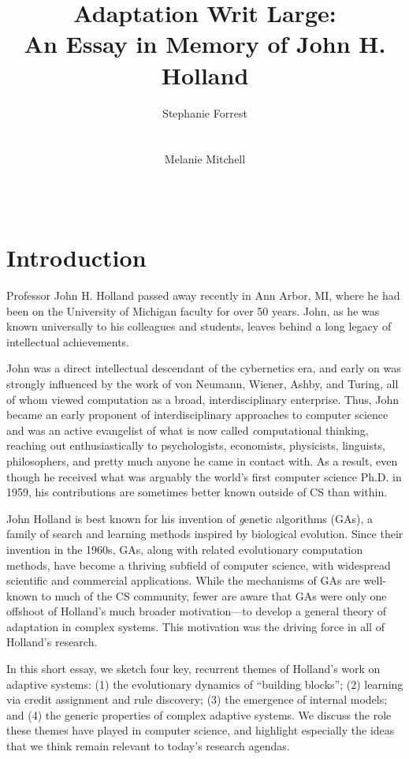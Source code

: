 \documentclass{sig-alternate}
\title{Adaptation Writ Large:\\ An Essay in Memory of John H. Holland}
\author 
{\alignauthor
 Stephanie Forrest\\
 \affaddr{University of New Mexico}\\
 \affaddr{Santa Fe Institute}\\
 \email{forrest@cs.unm.edu}
 \alignauthor
Melanie Mitchell \\
 \affaddr{Portland State University}\\
 \affaddr{Santa Fe Institute}\\
 \email{mm@pdx.edu}
}
\begin{document}
\maketitle

% 

\section{Introduction}

Professor John H. Holland passed away recently in Ann Arbor, MI, where
he had been on the University of Michigan faculty for over 50 years.
John, as he was known universally to his colleagues and students,
leaves behind a long legacy of intellectual achievements.  

John was a direct intellectual descendant of the cybernetics era, and
early on was strongly influenced by the work of von Neumann, Wiener,
Ashby, and Turing, all of whom viewed computation as a broad,
interdisciplinary enterprise.  Thus, John became an early proponent of
interdisciplinary approaches to computer science and was an active
evangelist of what is now called {\emph computational thinking}, reaching out
enthusiastically to psychologists, economists, physicists, linguists,
philosophers, and pretty much anyone he came in contact with.  As a
result, even though he received what was arguably the world's first
computer science Ph.D. in 1959, his contributions are sometimes better known
outside of CS than within.

John Holland is best known for his invention of {\emph genetic
  algorithms} (GAs), a family of search and learning methods inspired
by biological evolution.  Since their invention in the 1960s, GAs,
along with related evolutionary computation methods, have become a
thriving subfield of computer science, with widespread scientific and
commercial applications.  While the mechanisms of GAs are well-known
to much of the CS community, fewer are aware that GAs were only one
offshoot of Holland's much broader motivation---to develop a general
theory of adaptation in complex systems.  This motivation was the
driving force in all of Holland's research.   

In this short essay, we sketch four key, recurrent themes of Holland's
work on adaptive systems: (1) the evolutionary dynamics of ``building
blocks''; (2) learning via credit assignment and rule discovery; (3)
the emergence of internal models; and (4) the generic properties of
complex adaptive systems.  We discuss the role these themes have
played in computer science, and highlight especially the ideas that we
think remain relevant to today's research agendas.
\end{document}
